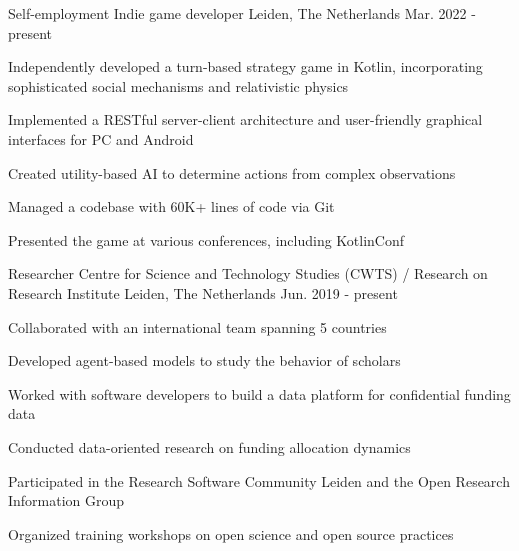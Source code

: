 

\begin{cventries}

  \cventry
    {Self-employment} %
    {Indie game developer} %
    {Leiden, The Netherlands} %
    {Mar. 2022 - present} %
    {
      \begin{cvitems} %
        \item{Independently developed a turn-based strategy game in Kotlin, incorporating sophisticated social mechanisms and relativistic physics}
        \item{Implemented a RESTful server-client architecture and user-friendly graphical interfaces for PC and Android}
        \item{Created utility-based AI to determine actions from complex observations}
        \item{Managed a codebase with 60K+ lines of code via Git}
        \item{Presented the game at various conferences, including KotlinConf}
      \end{cvitems}
    }

  \cventry
    {Researcher} %
    {Centre for Science and Technology Studies (CWTS) / Research on Research Institute} %
    {Leiden, The Netherlands} %
    {Jun. 2019 - present} %
    {
      \begin{cvitems} %
        \item{Collaborated with an international team spanning 5 countries}
        \item{Developed agent-based models to study the behavior of scholars}
        \item{Worked with software developers to build a data platform for confidential funding data}
        \item{Conducted data-oriented research on funding allocation dynamics}
        \item{Participated in the Research Software Community Leiden and the Open Research Information Group}
        \item{Organized training workshops on open science and open source practices}
      \end{cvitems}
    }


\end{cventries}
